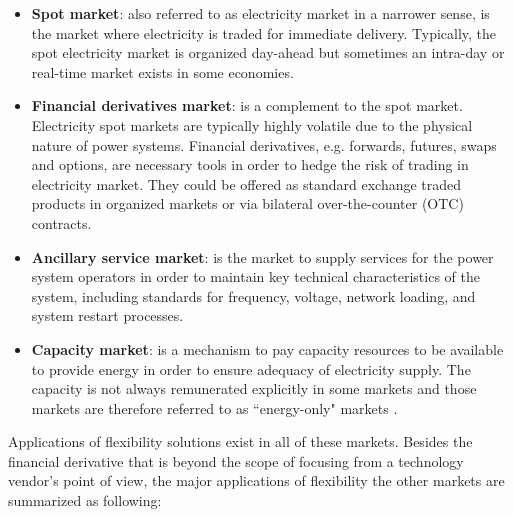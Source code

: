 \begin{itemize}
	\item \textbf{Spot market}: also referred to as electricity market in a narrower sense, is the market where electricity is traded for immediate delivery. Typically, the spot electricity market is organized day-ahead but sometimes an intra-day or real-time market exists in some economies.
	\item \textbf{Financial derivatives market}: is a complement to the spot market. Electricity spot markets are typically highly volatile due to the physical nature of power systems. Financial derivatives, e.g. forwards, futures, swaps and options, are necessary tools in order to hedge the risk of trading in electricity market. They could be offered as standard exchange traded products in organized markets or via bilateral over-the-counter (OTC) contracts.
	\item \textbf{Ancillary service market}: is the market to supply services for the power system operators in order to maintain key technical characteristics of the system, including standards for frequency, voltage, network loading, and system restart processes.
	\item \textbf{Capacity market}: is a mechanism to pay capacity resources to be available to provide energy in order to ensure adequacy of electricity supply. The capacity is not always remunerated explicitly in some markets and those markets are therefore referred to as ``energy-only" markets \cite{Brown2015}.
\end{itemize}

Applications of flexibility solutions exist in all of these markets. Besides the financial derivative that is beyond the scope of focusing from a technology vendor's point of view, the major applications of flexibility the other markets are summarized as following:

